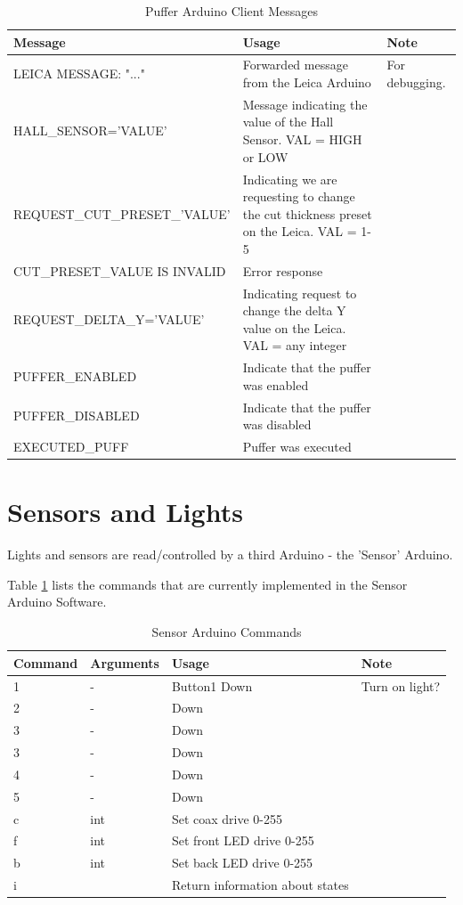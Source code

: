 \documentclass[11pt,fleqn]{book} %
\begin{document}
\begin{table}[h]
\centering
\begin{tabular}{l p{160pt} p{80pt}}
\toprule
\textbf{Message} & \textbf{Usage} & \textbf{Note}\\
\midrule
LEICA MESSAGE: "..." 			& Forwarded message from the Leica Arduino & For debugging. \\
HALL\_SENSOR='VALUE' 			& Message indicating the value of the Hall Sensor. VAL = HIGH or LOW & \\
REQUEST\_CUT\_PRESET\_'VALUE' 	& Indicating we are requesting to change the cut thickness preset on the Leica. VAL = 1-5 & \\
CUT\_PRESET\_VALUE IS INVALID 	& Error response &\\
REQUEST\_DELTA\_Y='VALUE'   	& Indicating request to change the delta Y value on the Leica. VAL = any integer & \\
PUFFER\_ENABLED					& Indicate that the puffer was enabled & \\
PUFFER\_DISABLED				& Indicate that the puffer was disabled & \\
EXECUTED\_PUFF 					& Puffer was executed & \\

\bottomrule
\end{tabular}
\caption{Puffer Arduino Client Messages}
\end{table}


\section{Sensors and Lights}
Lights and sensors are read/controlled by a third Arduino - the 'Sensor' Arduino.


Table \ref{tab:sac} lists the commands that are currently implemented in the Sensor Arduino Software.

\begin{table}[h]
\centering
\begin{tabular}{l l p{160pt} p{160pt}}
\toprule
\textbf{Command} & \textbf{Arguments} & \textbf{Usage} & \textbf{Note}\\
\midrule
1		& -	& Button1 Down & Turn on light? \\
2		& -	&  Down &  				\\
3		& -	&  Down & \\
3		& -	&  Down & \\
4		& -	&  Down & \\
5		& -	&  Down & \\
c		& int	&  Set coax drive 0-255 & \\
f		& int	&  Set front LED drive 0-255 & \\
b		& int	&  Set back LED drive 0-255 & \\
i		& 	&  Return information about states & \\

\bottomrule
\end{tabular}
\caption{Sensor Arduino Commands}\label{tab:sac}
\end{table}
\end{document}
